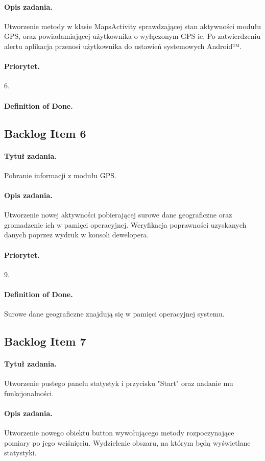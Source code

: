 \documentclass[a4paper]{article}
\begin{document}
\paragraph{Opis zadania.} Utworzenie metody w klasie MapsActivity sprawdzającej stan aktywności modułu GPS, oraz powiadamiającej użytkownika o wyłączonym GPS-ie. Po zatwierdzeniu alertu aplikacja przenosi użytkownika do ustawień systemowych Android™.
\paragraph{Priorytet.} 6.
\paragraph{Definition of Done.}

\subsection{Backlog Item 6}
\paragraph{Tytuł zadania.} Pobranie informacji z modułu GPS.
\paragraph{Opis zadania.} Utworzenie nowej aktywności pobierającej surowe dane geograficzne oraz gromadzenie ich w pamięci operacyjnej. Weryfikacja poprawności uzyskanych danych poprzez wydruk w konsoli dewelopera.
\paragraph{Priorytet.} 9.
\paragraph{Definition of Done.} Surowe dane geograficzne znajdują się w pamięci operacyjnej systemu.

\subsection{Backlog Item 7}
\paragraph{Tytuł zadania.} Utworzenie pustego panelu statystyk i przycisku "Start" oraz nadanie mu funkcjonalności.
\paragraph{Opis zadania.} Utworzenie nowego obiektu button wywołującego metody rozpoczynające pomiary po jego wciśnięciu. Wydzielenie obszaru, na którym będą wyświetlane statystyki.
\end{document}

